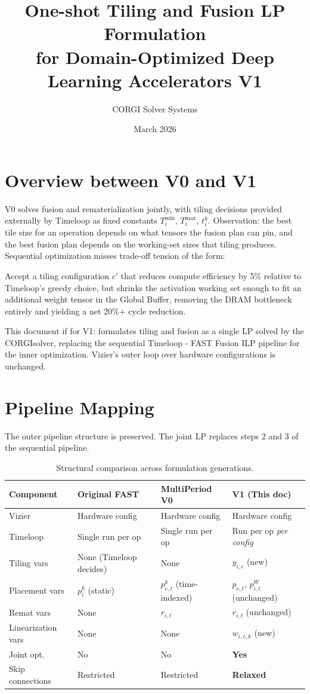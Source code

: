 \documentclass{article}
\title{One-shot Tiling and Fusion LP Formulation\\for Domain-Optimized Deep Learning Accelerators V1}
\author{CORGI Solver Systems}
\date{March 2026}
\begin{document}
\maketitle

\section{Overview between V0 and V1}

V0 solves fusion and rematerialization jointly, with tiling decisions provided externally by Timeloop
as fixed constants $T_i^{\min}$, $T_i^{\max}$, $t_i^k$. Observation: the best tile size for an operation depends on what tensors the fusion plan
can pin, and the best fusion plan depends on the working-set sizes that tiling produces.
Sequential optimization misses trade-off tension of the form:


Accept a tiling configuration $c'$ that reduces compute efficiency by 5\% relative to
Timeloop's greedy choice, but shrinks the activation working set enough to fit an additional
weight tensor in the Global Buffer, removing the DRAM bottleneck entirely and yielding
a net 20\%+ cycle reduction.


This document if for V1: formulates tiling and fusion as a single LP solved by the CORGIsolver, replacing the sequential Timeloop - FAST Fusion ILP pipeline
for the inner optimization. Vizier's outer loop over hardware configurations is unchanged.

\section{Pipeline Mapping}

The outer pipeline structure is preserved. The joint LP replaces steps 2 and 3 of the sequential pipeline.

\begin{table}[h!]
\centering
\begin{tabular}{llll}
\toprule
\textbf{Component} & \textbf{Original FAST} & \textbf{MultiPeriod V0} & \textbf{V1 (This doc)} \\
\midrule
Vizier            & Hardware config & Hardware config & Hardware config \\
Timeloop          & Single run per op & Single run per op & Run per op \textit{per config} \\
Tiling vars       & None (Timeloop decides) & None & $y_{i,c}$ (new) \\
Placement vars    & $p_i^k$ (static) & $p_{e,t}^k$ (time-indexed) & $p_{e,t},\, p_{i,t}^W$ (unchanged) \\
Remat vars        & None & $r_{i,t}$ & $r_{i,t}$ (unchanged) \\
Linearization vars & None & None & $w_{i,c,k}$ (new) \\
Joint opt.        & No & No & \textbf{Yes} \\
Skip connections  & Restricted & Restricted & \textbf{Relaxed} \\
\bottomrule
\end{tabular}
\caption{Structural comparison across formulation generations.}
\end{table}
\end{document}
